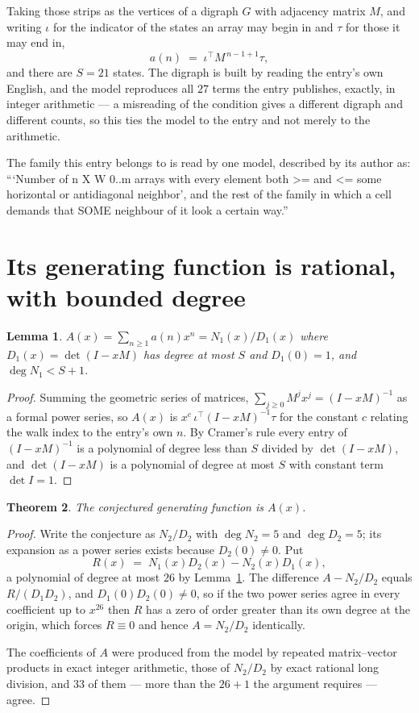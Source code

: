 \documentclass[11pt,a4paper]{article}
\theoremstyle{plain}
\newtheorem{theorem}{Theorem}
\newtheorem{lemma}[theorem]{Lemma}
\theoremstyle{definition}
\begin{document}
Taking those strips as the vertices of a digraph $G$ with adjacency matrix $M$, and writing
$\iota$ for the indicator of the states an array may begin in and $\tau$ for those it may end
in,
\[
a(n)\;=\;\iota^{\!\top}M^{\,n-1+1}\tau ,
\]
and there are $S=21$ states. The digraph is built by reading the entry's own English, and the
model reproduces all $27$ terms the entry publishes, exactly, in integer arithmetic --- a
misreading of the condition gives a different digraph and different counts, so this ties the
model to the entry and not merely to the arithmetic.

The family this entry belongs to is read by one model, described by its author as: ```Number of n X W 0..m arrays with every element both >= and <= some horizontal or antidiagonal neighbor', and the rest of the family in which a cell demands that SOME neighbour of it look a certain way.''


\section{Its generating function is rational, with bounded degree}

\begin{lemma}\label{lem:rat}
$A(x)=\sum_{n\ge1}a(n)x^n=N_1(x)/D_1(x)$ where $D_1(x)=\det(I-xM)$ has degree at most
$S$ and $D_1(0)=1$, and $\deg N_1<S+1$.
\end{lemma}

\begin{proof}
Summing the geometric series of matrices, $\sum_{j\ge0}M^jx^j=(I-xM)^{-1}$ as a formal
power series, so $A(x)$ is $x^{c}\,\iota^{\!\top}(I-xM)^{-1}\tau$ for the constant $c$
relating the walk index to the entry's own $n$. By Cramer's rule every entry of
$(I-xM)^{-1}$ is a polynomial of degree less than $S$ divided by $\det(I-xM)$, and
$\det(I-xM)$ is a polynomial of degree at most $S$ with constant term $\det I=1$.
\end{proof}

\begin{theorem}
The conjectured generating function is $A(x)$.
\end{theorem}

\begin{proof}
Write the conjecture as $N_2/D_2$ with $\deg N_2=5$ and $\deg D_2=5$; its expansion as a
power series exists because $D_2(0)\neq0$. Put
\[
R(x)\;=\;N_1(x)D_2(x)-N_2(x)D_1(x),
\]
a polynomial of degree at most $26$ by Lemma~\ref{lem:rat}. The difference
$A-N_2/D_2$ equals $R/(D_1D_2)$, and $D_1(0)D_2(0)\neq0$, so if the two power series agree in
every coefficient up to $x^{26}$ then $R$ has a zero of order greater than its own
degree at the origin, which forces $R\equiv0$ and hence $A=N_2/D_2$ identically.

The coefficients of $A$ were produced from the model by repeated matrix--vector products in
exact integer arithmetic, those of $N_2/D_2$ by exact rational long division, and $33$
of them --- more than the $26+1$ the argument requires --- agree.
\end{proof}
\end{document}
